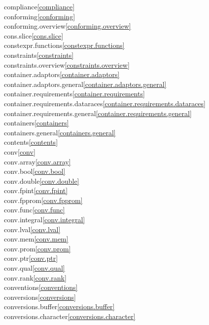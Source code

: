 \begin{multicols}{2}
compliance\quad\ref{compliance}\\
conforming\quad\ref{conforming}\\
conforming.overview\quad\ref{conforming.overview}\\
cons.slice\quad\ref{cons.slice}\\
constexpr.functions\quad\ref{constexpr.functions}\\
constraints\quad\ref{constraints}\\
constraints.overview\quad\ref{constraints.overview}\\
container.adaptors\quad\ref{container.adaptors}\\
container.adaptors.general\quad\ref{container.adaptors.general}\\
container.requirements\quad\ref{container.requirements}\\
container.requirements.dataraces\quad\ref{container.requirements.dataraces}\\
container.requirements.general\quad\ref{container.requirements.general}\\
containers\quad\ref{containers}\\
containers.general\quad\ref{containers.general}\\
contents\quad\ref{contents}\\
conv\quad\ref{conv}\\
conv.array\quad\ref{conv.array}\\
conv.bool\quad\ref{conv.bool}\\
conv.double\quad\ref{conv.double}\\
conv.fpint\quad\ref{conv.fpint}\\
conv.fpprom\quad\ref{conv.fpprom}\\
conv.func\quad\ref{conv.func}\\
conv.integral\quad\ref{conv.integral}\\
conv.lval\quad\ref{conv.lval}\\
conv.mem\quad\ref{conv.mem}\\
conv.prom\quad\ref{conv.prom}\\
conv.ptr\quad\ref{conv.ptr}\\
conv.qual\quad\ref{conv.qual}\\
conv.rank\quad\ref{conv.rank}\\
conventions\quad\ref{conventions}\\
conversions\quad\ref{conversions}\\
conversions.buffer\quad\ref{conversions.buffer}\\
conversions.character\quad\ref{conversions.character}\\

\end{multicols}
